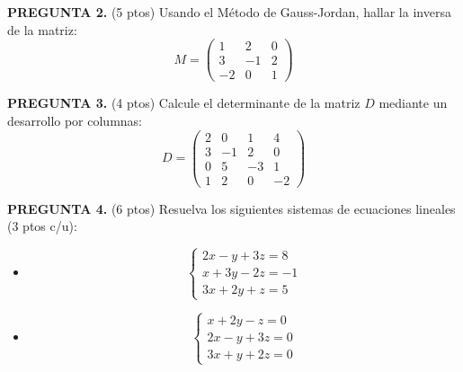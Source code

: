 \documentclass[10pt,letterpaper,landscape]{article}
\begin{document}
	\textbf{PREGUNTA 2.} (5 ptos) Usando el Método de Gauss-Jordan, hallar la inversa de la matriz:
	\[
	M = \begin{pmatrix} 1 & 2 & 0 \\ 3 & -1 & 2 \\ -2 & 0 & 1 \end{pmatrix}
	\]
	
	\vspace{0.8cm}
	
	\textbf{PREGUNTA 3.} (4 ptos) Calcule el determinante de la matriz $D$ mediante un desarrollo por columnas:
	\[
	D = \begin{pmatrix} 2 & 0 & 1 & 4 \\ 3 & -1 & 2 & 0 \\ 0 & 5 & -3 & 1 \\ 1 & 2 & 0 & -2 \end{pmatrix}
	\]
	
	\vspace{0.8cm}
	
	\textbf{PREGUNTA 4.} (6 ptos) Resuelva los siguientes sistemas de ecuaciones lineales (3 ptos c/u):
	
	\begin{itemize}
		\item[a)] 
		\[
		\begin{cases}
			2x - y + 3z = 8 \\
			x + 3y - 2z = -1 \\
			3x + 2y + z = 5
		\end{cases}
		\]
		
		\item[b)] 
		\[
		\begin{cases}
			x + 2y - z = 0 \\
			2x - y + 3z = 0 \\
			3x + y + 2z = 0
		\end{cases}
		\]
	\end{itemize}
	
\end{document}
